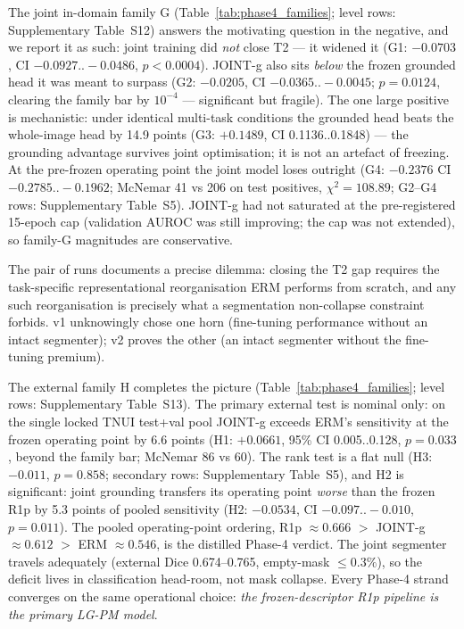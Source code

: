 \documentclass[jimh,article,submit,moreauthors,pdftex]{Definitions/tsp}
\begin{document}
The joint in-domain family G (Table~\ref{tab:phase4_families}; level
rows: Supplementary Table~S12) answers the motivating question in the
negative, and we report it as such: joint training did \emph{not} close
T2 --- it widened it (G1: $-0.0703$, CI $-0.0927..-0.0486$,
$p{<}0.0004$). JOINT-g also sits \emph{below} the frozen grounded head
it was meant to surpass (G2: $-0.0205$, CI $-0.0365..-0.0045$;
$p{=}0.0124$, clearing the family bar by $10^{-4}$ --- significant but
fragile). The one large positive is mechanistic: under identical
multi-task conditions the grounded head beats the whole-image head by
14.9 points (G3: $+0.1489$, CI 0.1136..0.1848) --- the grounding
advantage survives joint optimisation; it is not an artefact of
freezing. At the pre-frozen operating point the joint model loses
outright (G4: $-0.2376$ CI $-0.2785..-0.1962$; McNemar 41 vs 206 on
test positives, $\chi^2{=}108.89$; G2--G4 rows: Supplementary
Table~S5). JOINT-g had not saturated at the pre-registered 15-epoch cap
(validation AUROC was still improving; the cap was not extended), so
family-G magnitudes are conservative.

The pair of runs documents a precise dilemma: closing the T2 gap
requires the task-specific representational reorganisation ERM performs
from scratch, and any such reorganisation is precisely what a
segmentation non-collapse constraint forbids. v1 unknowingly chose one
horn (fine-tuning performance without an intact segmenter); v2 proves
the other (an intact segmenter without the fine-tuning premium).

The external family H completes the picture
(Table~\ref{tab:phase4_families}; level rows: Supplementary Table~S13).
The primary external test is nominal only: on the single locked
TNUI test+val pool JOINT-g exceeds ERM's sensitivity at the frozen
operating point by 6.6 points (H1: $+0.0661$, 95\% CI 0.005..0.128,
$p{=}0.033$, beyond the family bar; McNemar 86 vs 60). The rank test
is a flat null (H3: $-0.011$, $p{=}0.858$; secondary rows:
Supplementary Table~S5), and H2 is significant: joint grounding
transfers its operating point \emph{worse} than the frozen R1p by 5.3
points of pooled sensitivity (H2: $-0.0534$, CI $-0.097..-0.010$,
$p{=}0.011$). The
pooled operating-point ordering, R1p $\approx 0.666$ $>$ JOINT-g
$\approx 0.612$ $>$ ERM $\approx 0.546$, is the distilled Phase-4
verdict. The joint segmenter travels adequately (external Dice
0.674--0.765, empty-mask $\leq 0.3\%$), so the deficit lives in
classification head-room, not mask collapse. Every Phase-4 strand
converges on the same operational choice: \emph{the frozen-descriptor
R1p pipeline is the primary LG-PM model}.
\end{document}
